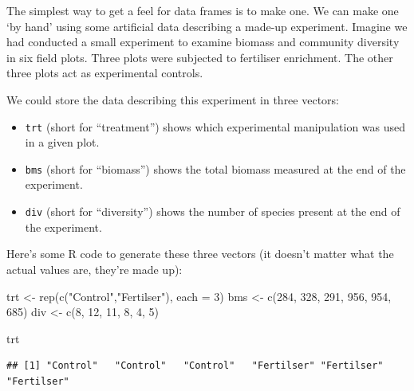 \documentclass[
]{book}
\newenvironment{Shaded}{\begin{snugshade}}{\end{snugshade}}
\newcommand{\AttributeTok}[1]{\textcolor[rgb]{0.77,0.63,0.00}{#1}}
\newcommand{\DecValTok}[1]{\textcolor[rgb]{0.00,0.00,0.81}{#1}}
\newcommand{\FunctionTok}[1]{\textcolor[rgb]{0.00,0.00,0.00}{#1}}
\newcommand{\NormalTok}[1]{#1}
\newcommand{\OtherTok}[1]{\textcolor[rgb]{0.56,0.35,0.01}{#1}}
\newcommand{\StringTok}[1]{\textcolor[rgb]{0.31,0.60,0.02}{#1}}
\providecommand{\tightlist}{%
  \setlength{\itemsep}{0pt}\setlength{\parskip}{0pt}}
\begin{document}
The simplest way to get a feel for data frames is to make one. We can make one `by hand' using some artificial data describing a made-up experiment. Imagine we had conducted a small experiment to examine biomass and community diversity in six field plots. Three plots were subjected to fertiliser enrichment. The other three plots act as experimental controls.

We could store the data describing this experiment in three vectors:

\begin{itemize}
\tightlist
\item
  \texttt{trt} (short for ``treatment'') shows which experimental manipulation was used in a given plot.
\item
  \texttt{bms} (short for ``biomass'') shows the total biomass measured at the end of the experiment.
\item
  \texttt{div} (short for ``diversity'') shows the number of species present at the end of the experiment.
\end{itemize}

Here's some R code to generate these three vectors (it doesn't matter what the actual values are, they're made up):

\begin{Shaded}
\begin{Highlighting}[]
\NormalTok{trt }\OtherTok{\textless{}{-}} \FunctionTok{rep}\NormalTok{(}\FunctionTok{c}\NormalTok{(}\StringTok{"Control"}\NormalTok{,}\StringTok{"Fertilser"}\NormalTok{), }\AttributeTok{each =} \DecValTok{3}\NormalTok{) }
\NormalTok{bms }\OtherTok{\textless{}{-}} \FunctionTok{c}\NormalTok{(}\DecValTok{284}\NormalTok{, }\DecValTok{328}\NormalTok{, }\DecValTok{291}\NormalTok{, }\DecValTok{956}\NormalTok{, }\DecValTok{954}\NormalTok{, }\DecValTok{685}\NormalTok{)}
\NormalTok{div }\OtherTok{\textless{}{-}} \FunctionTok{c}\NormalTok{(}\DecValTok{8}\NormalTok{, }\DecValTok{12}\NormalTok{, }\DecValTok{11}\NormalTok{, }\DecValTok{8}\NormalTok{, }\DecValTok{4}\NormalTok{, }\DecValTok{5}\NormalTok{)}
\end{Highlighting}
\end{Shaded}

\begin{Shaded}
\begin{Highlighting}[]
\NormalTok{trt}
\end{Highlighting}
\end{Shaded}

\begin{verbatim}
## [1] "Control"   "Control"   "Control"   "Fertilser" "Fertilser" "Fertilser"
\end{verbatim}
\end{document}
